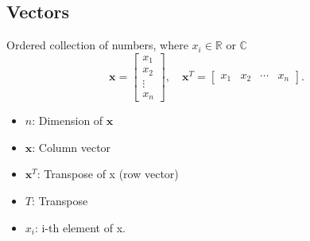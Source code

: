 \subsection{Vectors}
\begin{definition}
    Ordered collection of numbers, where \( x_i \in \mathbb{R}\) or \(\mathbb{C}\)
    \begin{equation*}
        \mathbf{x} = \begin{bmatrix}
            x_1 \\
            x_2 \\
            \vdots \\
            x_n
        \end{bmatrix}, \quad 
        \mathbf{x}^T = \begin{bmatrix}
            x_1 & x_2 & \cdots & x_n
        \end{bmatrix}.
    \end{equation*}
    
    \begin{itemize}
        \item $n$: Dimension of $\mathbf{x}$
        \item $\mathbf{x}$: Column vector
        \item $\mathbf{x}^T$: Transpose of x (row vector)
        \item $T$: Transpose
        \item $x_i$: i-th element of x.
    \end{itemize}
\end{definition}

